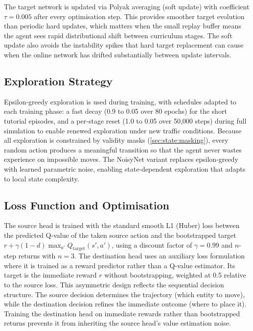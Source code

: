 The target network is updated via Polyak averaging (soft update) with coefficient $\tau = 0.005$ after every optimisation step. This provides smoother target evolution than periodic hard updates, which matters when the small replay buffer means the agent sees rapid distributional shift between curriculum stages. The soft update also avoids the instability spikes that hard target replacement can cause when the online network has drifted substantially between update intervals.

\subsection{Exploration Strategy}
\label{sec:agent:training:exploration}

Epsilon-greedy exploration is used during training, with schedules adapted to each training phase: a fast decay (0.9 to 0.05 over 80 epochs) for the short tutorial episodes, and a per-stage reset (1.0 to 0.05 over 50{,}000 steps) during full simulation to enable renewed exploration under new traffic conditions. Because all exploration is constrained by validity masks (\cref{sec:state:masking}), every random action produces a meaningful transition so that the agent never wastes experience on impossible moves. The NoisyNet variant replaces epsilon-greedy with learned parametric noise, enabling state-dependent exploration that adapts to local state complexity.

\subsection{Loss Function and Optimisation}
\label{sec:agent:training:loss}

The source head is trained with the standard smooth L1 (Huber) loss between the predicted Q-value of the taken source action and the bootstrapped target $r + \gamma (1 - d) \max_{a'} Q_\text{target}(s', a')$, using a discount factor of $\gamma = 0.99$ and $n$-step returns \cite{sutton1988td} with $n = 3$. The destination head uses an auxiliary loss formulation where it is trained as a reward predictor rather than a Q-value estimator. Its target is the immediate reward $r$ without bootstrapping, weighted at 0.5 relative to the source loss. This asymmetric design reflects the sequential decision structure. The source decision determines the trajectory (which entity to move), while the destination decision refines the immediate outcome (where to place it). Training the destination head on immediate rewards rather than bootstrapped returns prevents it from inheriting the source head's value estimation noise.

